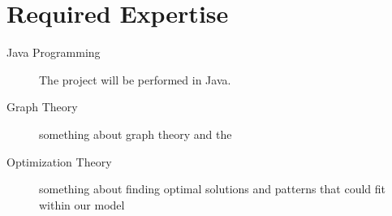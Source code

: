 \section{Required Expertise}

\begin{description}
    \item[Java Programming] The project will be performed in Java.
    \item[Graph Theory] something about graph theory and the 
    \item[Optimization Theory] something about finding optimal solutions and patterns that could fit within our model 
\end{description}